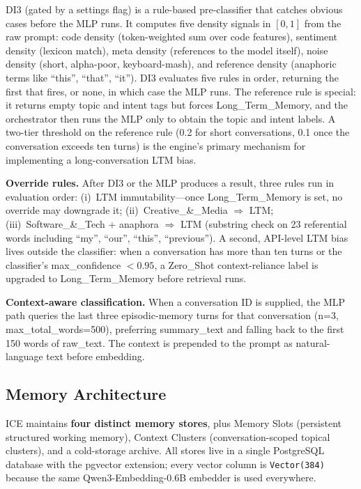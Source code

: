 \documentclass[10pt]{article}
\begin{document}
DI3 (gated by a settings flag) is a rule-based pre-classifier that catches obvious cases before the MLP runs. It computes five density signals in $[0,1]$ from the raw prompt: code density (token-weighted sum over code features), sentiment density (lexicon match), meta density (references to the model itself), noise density (short, alpha-poor, keyboard-mash), and reference density (anaphoric terms like ``this'', ``that'', ``it''). DI3 evaluates five rules in order, returning the first that fires, or none, in which case the MLP runs. The reference rule is special: it returns empty topic and intent tags but forces Long\_Term\_Memory, and the orchestrator then runs the MLP only to obtain the topic and intent labels. A two-tier threshold on the reference rule (0.2 for short conversations, 0.1 once the conversation exceeds ten turns) is the engine's primary mechanism for implementing a long-conversation LTM bias.

\textbf{Override rules.} After DI3 or the MLP produces a result, three rules run in evaluation order: (i)~LTM immutability---once Long\_Term\_Memory is set, no override may downgrade it; (ii)~Creative\_\&\_Media $\Rightarrow$ LTM; (iii)~Software\_\&\_Tech + anaphora $\Rightarrow$ LTM (substring check on 23 referential words including ``my'', ``our'', ``this'', ``previous''). A second, API-level LTM bias lives outside the classifier: when a conversation has more than ten turns or the classifier's max\_confidence $< 0.95$, a Zero\_Shot context-reliance label is upgraded to Long\_Term\_Memory before retrieval runs.

\textbf{Context-aware classification.} When a conversation ID is supplied, the MLP path queries the last three episodic-memory turns for that conversation (n=3, max\_total\_words=500), preferring summary\_text and falling back to the first 150 words of raw\_text. The context is prepended to the prompt as natural-language text before embedding.

\subsection{Memory Architecture}

ICE maintains \textbf{four distinct memory stores}, plus Memory Slots (persistent structured working memory), Context Clusters (conversation-scoped topical clusters), and a cold-storage archive. All stores live in a single PostgreSQL database with the pgvector extension; every vector column is \texttt{Vector(384)} because the same Qwen3-Embedding-0.6B embedder is used everywhere.
\end{document}
